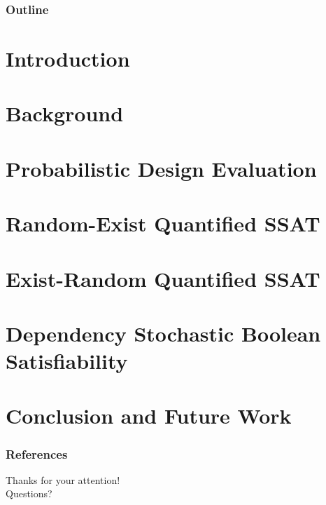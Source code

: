


\frame{\titlepage}

\begin{frame}
    \frametitle{Outline}
    \tableofcontents[hideallsubsections]
\end{frame}

\section{Introduction}

\section{Background}

\section{Probabilistic Design Evaluation}

\section{Random-Exist Quantified SSAT}

\section{Exist-Random Quantified SSAT}

\section{Dependency Stochastic Boolean Satisfiability}

\section{Conclusion and Future Work}


\begin{frame}[allowframebreaks]
    \frametitle{References}
    
    
\end{frame}

\begin{frame}
    \centering\Large
    Thanks for your attention!\\
    Questions?
\end{frame}

\appendix


